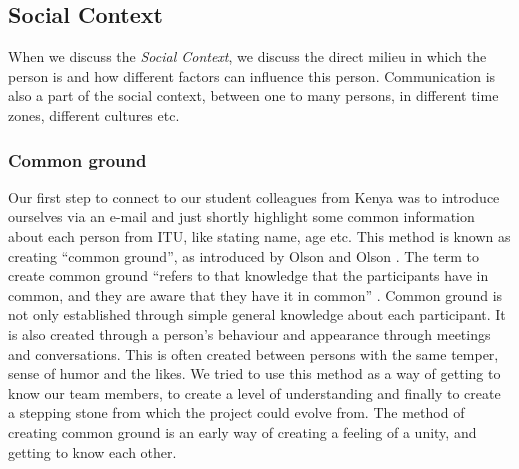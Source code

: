 %
%
%

\subsection{Social Context} \label{subsec:socialcontext}
When we discuss the \textit{Social Context}, we discuss the direct milieu in which the person is and how different factors can influence this person. Communication is also a part of the social context, 
between one to many persons, in different time zones, different cultures etc.\\

\subsubsection{Common ground} \label{subsubsec:commonground}
Our first step to connect to our student colleagues from Kenya was to introduce ourselves via an e-mail and just shortly highlight some common information about each person from ITU, like stating name, age etc. This method is known as creating ``common ground'', as introduced by Olson and Olson \cite{olson:2000:distance}. The term to create common ground ``refers to that knowledge that the participants have in common, and they are aware that they have it in common'' \cite{olson:2000:distance}. Common ground is not only established through simple general knowledge about each participant. It is also created through a person's behaviour and appearance through meetings and conversations. This is often created between persons with the same temper, sense of humor and the likes. We tried to use this method as a way of getting to know our team members, to create a level of understanding and finally to create a stepping stone from which the project could evolve from. The method of creating common ground is an early way of creating a feeling of a unity, and getting to know each other.

